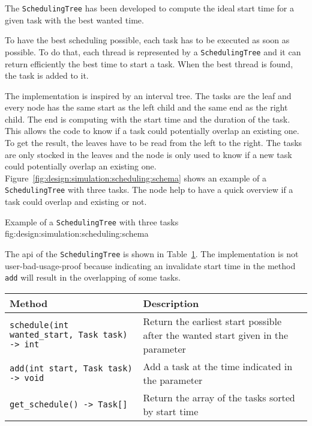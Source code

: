 The \texttt{SchedulingTree} has been developed to compute the ideal start time
for a given task with the best wanted time.

To have the best scheduling possible, each task has to be executed as soon as
possible.
To do that, each thread is represented by a \texttt{SchedulingTree} and it can
return efficiently the best time to start a task.
When the best thread is found, the task is added to it.

The implementation is inspired by an interval tree.
The tasks are the leaf and every node has the same start as the left child and
the same end as the right child.
The end is computing with the start time and the duration of the task.
This allows the code to know if a task could potentially overlap an existing one.
To get the result, the leaves have to be read from the left to the right.
The tasks are only stocked in the leaves and the node is only used to know if a
new task could potentially overlap an existing one.
Figure~\ref{fig:design:simulation:scheduling:schema} shows an example of a
\texttt{SchedulingTree} with three tasks.
The node help to have a quick overview if a task could overlap and existing or
not.

        {Example of a \texttt{SchedulingTree} with three tasks}
        {fig:design:simulation:scheduling:schema}

The \acrshort{api} of the \texttt{SchedulingTree} is shown in Table~\ref{tab:design:simulation:scheduling:api}.
The implementation is not user-bad-usage-proof because indicating an invalidate
start time in the method \texttt{add} will result in the overlapping of some
tasks.

\begin{table}[ht]
    \centering
    \begin{tabular}{|m{}|m{}|}
        \hline
        \textbf{Method} & \textbf{Description} \\
        \hline
        \texttt{schedule(int wanted\_start, Task task) -> int} & Return the earliest start possible after the wanted start given in the parameter \\
        \hline
        \texttt{add(int start, Task task) -> void} & Add a task at the time indicated in the parameter \\
        \hline
        \texttt{get\_schedule() -> Task[]} & Return the array of the tasks sorted by start time \\
        \hline
    \end{tabular}
    \label{tab:design:simulation:scheduling:api}
\end{table}

